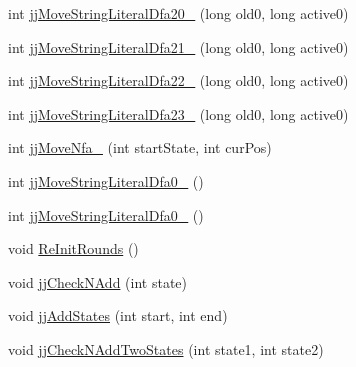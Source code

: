 \begin{DoxyCompactItemize}
\item 
int \hyperlink{classde_1_1uulm_1_1ecs_1_1ai_1_1owlapi_1_1krssparser_1_1_k_r_s_s2_parser_token_manager_aae862876f4a8efb4f827380a4b880d18}{jj\-Move\-String\-Literal\-Dfa20\-\_} (long old0, long active0)
\item 
int \hyperlink{classde_1_1uulm_1_1ecs_1_1ai_1_1owlapi_1_1krssparser_1_1_k_r_s_s2_parser_token_manager_aa88dd2001986125e2672516edbf23fe3}{jj\-Move\-String\-Literal\-Dfa21\-\_} (long old0, long active0)
\item 
int \hyperlink{classde_1_1uulm_1_1ecs_1_1ai_1_1owlapi_1_1krssparser_1_1_k_r_s_s2_parser_token_manager_ad3abc31f88dddde5d3dd6b0551b22646}{jj\-Move\-String\-Literal\-Dfa22\-\_} (long old0, long active0)
\item 
int \hyperlink{classde_1_1uulm_1_1ecs_1_1ai_1_1owlapi_1_1krssparser_1_1_k_r_s_s2_parser_token_manager_afbdcffb2269eb450273d5b5f15d42b5c}{jj\-Move\-String\-Literal\-Dfa23\-\_} (long old0, long active0)
\item 
int \hyperlink{classde_1_1uulm_1_1ecs_1_1ai_1_1owlapi_1_1krssparser_1_1_k_r_s_s2_parser_token_manager_a55a8f953307308c927c6cac81b4a4830}{jj\-Move\-Nfa\-\_} (int start\-State, int cur\-Pos)
\item 
int \hyperlink{classde_1_1uulm_1_1ecs_1_1ai_1_1owlapi_1_1krssparser_1_1_k_r_s_s2_parser_token_manager_a01ba279b60859a83e429db5ce177275e}{jj\-Move\-String\-Literal\-Dfa0\-\_} ()
\item 
int \hyperlink{classde_1_1uulm_1_1ecs_1_1ai_1_1owlapi_1_1krssparser_1_1_k_r_s_s2_parser_token_manager_ad7895ce8cb29f4b99d0864d59f8893f7}{jj\-Move\-String\-Literal\-Dfa0\-\_} ()
\item 
void \hyperlink{classde_1_1uulm_1_1ecs_1_1ai_1_1owlapi_1_1krssparser_1_1_k_r_s_s2_parser_token_manager_a19dd958c5141bbc0638187bf56a9a385}{Re\-Init\-Rounds} ()
\item 
void \hyperlink{classde_1_1uulm_1_1ecs_1_1ai_1_1owlapi_1_1krssparser_1_1_k_r_s_s2_parser_token_manager_ad942a050c5f9d1a2a5f2b6bf92e09eac}{jj\-Check\-N\-Add} (int state)
\item 
void \hyperlink{classde_1_1uulm_1_1ecs_1_1ai_1_1owlapi_1_1krssparser_1_1_k_r_s_s2_parser_token_manager_ad94428f58a5e03c1240e36864d9238b7}{jj\-Add\-States} (int start, int end)
\item 
void \hyperlink{classde_1_1uulm_1_1ecs_1_1ai_1_1owlapi_1_1krssparser_1_1_k_r_s_s2_parser_token_manager_ace70c7e5f0dc728a7d2f94a6c22bdac2}{jj\-Check\-N\-Add\-Two\-States} (int state1, int state2)
\end{DoxyCompactItemize}
